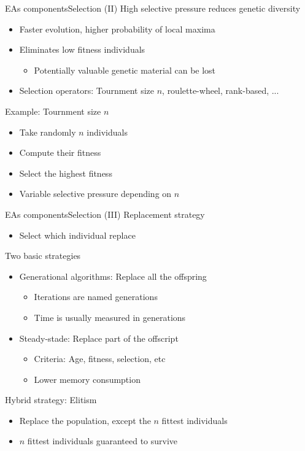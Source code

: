 \documentclass[10pt,compress]{beamer} %
\begin{document}
\begin{frame}{EAs components}{Selection (II)} 
	High selective pressure reduces \alert{genetic diversity}
	\begin{itemize}
		\item Faster evolution, higher probability of local maxima
		\item Eliminates low fitness individuals
		\begin{itemize}
			\item Potentially valuable genetic material can be lost
		\end{itemize}
		\item Selection operators: Tournment size $n$, roulette-wheel, rank-based, ...
	\end{itemize}
	
	Example: Tournment size $n$
	\begin{itemize}
		\item Take randomly $n$ individuals
		\item Compute their fitness
		\item Select the highest fitness
		\item Variable selective pressure depending on $n$
	\end{itemize}
\end{frame}

\begin{frame}{EAs components}{Selection (III)} 
	Replacement strategy
	\begin{itemize}
		\item Select which individual replace
	\end{itemize}
	
	Two basic strategies
	\begin{itemize}
		\item Generational algorithms: Replace all the offspring
		\begin{itemize}
			\item Iterations are named \alert{generations}
			\item Time is usually measured in generations
		\end{itemize}
		\item Steady-stade: Replace part of the offscript
		\begin{itemize}
			\item Criteria: Age, fitness, selection, etc
			\item Lower memory consumption
		\end{itemize}
	\end{itemize}
	Hybrid strategy: \alert{Elitism}
		\begin{itemize}
			\item Replace the population, except the $n$ fittest individuals
			\item $n$ fittest individuals guaranteed to survive
		\end{itemize}
\end{frame}
\end{document}
